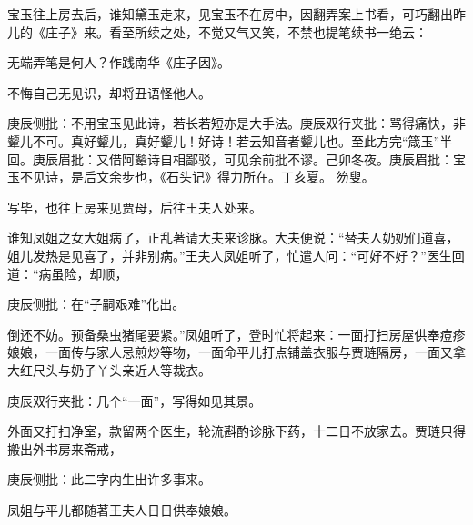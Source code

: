 \begin{parag}
    宝玉往上房去后，谁知黛玉走来，见宝玉不在房中，因翻弄案上书看，可巧翻出昨儿的《庄子》来。看至所续之处，不觉又气又笑，不禁也提笔续书一绝云：
\end{parag}
\begin{poem}
    \begin{pl}无端弄笔是何人？作践南华《庄子因》。\end{pl}

    \begin{pl}不悔自己无见识，却将丑语怪他人。\end{pl}
    \begin{note}庚辰侧批：不用宝玉见此诗，若长若短亦是大手法。庚辰双行夹批：骂得痛快，非颦儿不可。真好颦儿，真好颦儿！好诗！若云知音者颦儿也。至此方完“箴玉”半回。庚辰眉批：又借阿颦诗自相鄙驳，可见余前批不谬。己卯冬夜。庚辰眉批：宝玉不见诗，是后文余步也，《石头记》得力所在。丁亥夏。 笏叟。\end{note}
\end{poem}
\begin{parag}
    写毕，也往上房来见贾母，后往王夫人处来。
\end{parag}


\begin{parag}
    谁知凤姐之女大姐病了，正乱著请大夫来诊脉。大夫便说：“替夫人奶奶们道喜，姐儿发热是见喜了，并非别病。”王夫人凤姐听了，忙遣人问：“可好不好？”医生回道：“病虽险，却顺，\begin{note}庚辰侧批：在“子嗣艰难”化出。\end{note}倒还不妨。预备桑虫猪尾要紧。”凤姐听了，登时忙将起来：一面打扫房屋供奉痘疹娘娘，一面传与家人忌煎炒等物，一面命平儿打点铺盖衣服与贾琏隔房，一面又拿大红尺头与奶子丫头亲近人等裁衣。\begin{note}庚辰双行夹批：几个“一面”，写得如见其景。\end{note}外面又打扫净室，款留两个医生，轮流斟酌诊脉下药，十二日不放家去。贾琏只得搬出外书房来斋戒，\begin{note}庚辰侧批：此二字内生出许多事来。\end{note}凤姐与平儿都随著王夫人日日供奉娘娘。
\end{parag}


